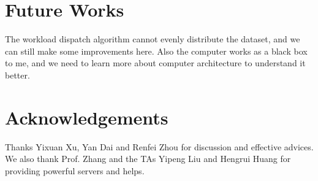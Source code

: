 \documentclass[10pt,letterpaper]{article}
\begin{document}
\section {Future Works}
	The workload dispatch algorithm cannot evenly distribute the dataset, and we can still make some improvements here. Also the computer works as a black box to me, and we need to learn more about computer architecture to understand it better.
\section {Acknowledgements}
	Thanks Yixuan Xu, Yan Dai and Renfei Zhou for discussion and effective advices. We also thank Prof. Zhang and the TAs Yipeng Liu and Hengrui Huang for providing powerful servers and helps.
\end{document}
